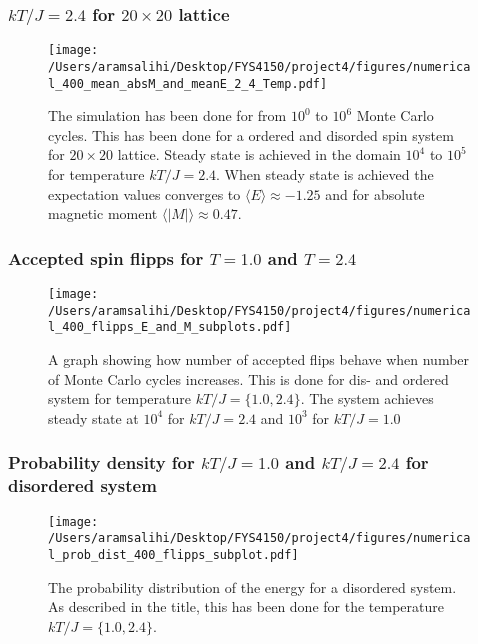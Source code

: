 \documentclass[a4paper, 10pt]{article}
\begin{document}
\subsubsection{$kT/J = 2.4$ for $20\times 20$ lattice}
\begin{figure}[H]
  \texttt{[image: /Users/aramsalihi/Desktop/FYS4150/project4/figures/numerical\_400\_mean\_absM\_and\_meanE\_2\_4\_Temp.pdf]}
  \centering
  \caption{The simulation has been done for from $10^{0}$ to $10^{6}$ Monte Carlo cycles. This has been done for
  a ordered and disorded spin system for $20\times 20$ lattice. Steady state is achieved in the domain $10^{4}$ to $10^{5}$ for temperature $kT/J = 2.4$.
  When steady state is achieved the expectation values converges to $\langle E \rangle \approx -1.25$ and for absolute magnetic moment $\langle |M| \rangle \approx 0.47$.}
  \label{T = 2.4 20x20}
\end{figure}
\subsubsection{Accepted spin flipps for $T = 1.0$ and $T = 2.4$}
\begin{figure}[H]
  \texttt{[image: /Users/aramsalihi/Desktop/FYS4150/project4/figures/numerical\_400\_flipps\_E\_and\_M\_subplots.pdf]}
  \centering
  \caption{A graph showing how number of accepted flips behave when number of Monte Carlo cycles increases.
  This is done for dis- and ordered system for temperature $kT/J = \{1.0,2.4\}$. The system achieves steady state at $10^{4}$ for $kT/J = 2.4$ and $10^{3}$ for $kT/J = 1.0$}
  \label{accept flips}
\end{figure}
\subsubsection{Probability density for $kT/J = 1.0$ and $kT/J = 2.4$ for disordered system}
\begin{figure}[H]
  \texttt{[image: /Users/aramsalihi/Desktop/FYS4150/project4/figures/numerical\_prob\_dist\_400\_flipps\_subplot.pdf]}
  \centering
  \caption{The probability distribution of the energy for a disordered system. As described in the title, this has been done for
  the temperature $kT/J = \{1.0,2.4\}$.}
  \label{prob dist}
\end{figure}
\end{document}
